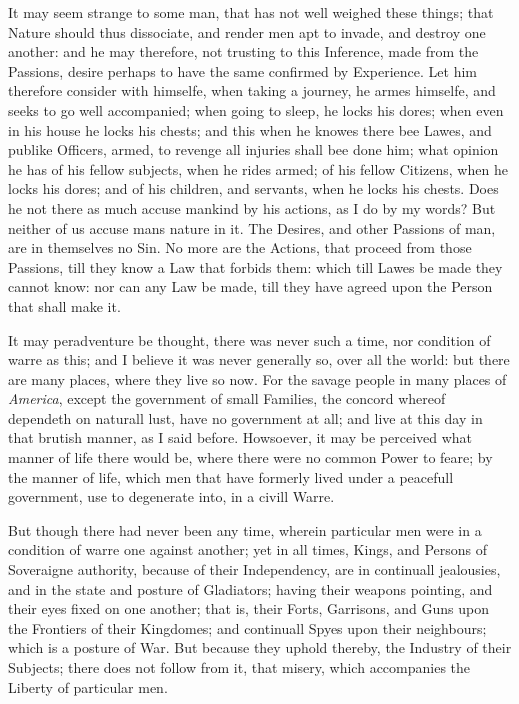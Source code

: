 It may seem strange to some man, that has not well weighed these
things; that Nature should thus dissociate, and render men apt to
invade, and destroy one another: and he may therefore, not trusting to
this Inference, made from the Passions, desire perhaps to have the
same confirmed by Experience. Let him therefore consider with
himselfe, when taking a journey, he armes himselfe, and seeks to go
well accompanied; when going to sleep, he locks his dores; when even
in his house he locks his chests; and this when he knowes there bee
Lawes, and publike Officers, armed, to revenge all injuries shall bee
done him; what opinion he has of his fellow subjects, when he rides
armed; of his fellow Citizens, when he locks his dores; and of his
children, and servants, when he locks his chests. Does he not there as
much accuse mankind by his actions, as I do by my words? But neither
of us accuse mans nature in it. The Desires, and other Passions of
man, are in themselves no Sin. No more are the Actions, that proceed
from those Passions, till they know a Law that forbids them: which
till Lawes be made they cannot know: nor can any  Law be
made, till they have agreed upon the Person that shall make it.

It may peradventure be thought, there was never such a time, nor
condition of warre as this; and I believe it was never generally so,
over all the world: but there are many places, where they live so now.
For the savage people in many places of \textit{America}, except the
government of small Families, the concord whereof dependeth on
naturall lust, have no government at all; and live at this day in that
brutish manner, as I said before. Howsoever, it may be perceived what
manner of life there would be, where there were no common Power to
feare; by the manner of life, which men that have formerly lived under
a peacefull government, use to degenerate into, in a civill Warre.

But though there had never been any time, wherein particular men were
in a condition of warre one against another; yet in all times, Kings,
and Persons of Soveraigne authority, because of their Independency,
are in continuall jealousies, and in the state and posture of
Gladiators; having their weapons pointing, and their eyes fixed on one
another; that is, their Forts, Garrisons, and Guns upon the Frontiers
of their Kingdomes; and continuall Spyes upon their neighbours; which
is a posture of War. But because they uphold thereby, the Industry of
their Subjects; there does not follow from it, that misery, which
accompanies the Liberty of particular men.


